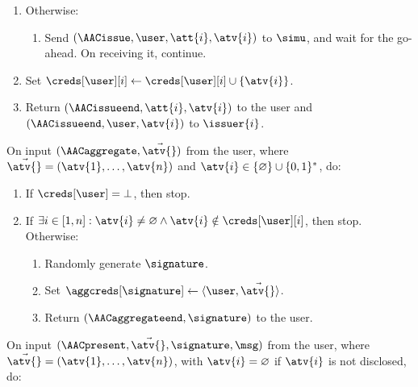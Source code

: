 \begin{framed}
\begin{enumerate}
\begin{enumerate}
	    \end{enumerate}

	  \item Otherwise:

	    \begin{enumerate}

	      \item Send $(\AACissue, \user, \att{i}, \atv{i})$ to $\simu$, and
wait for the go-ahead. On receiving it, continue.

	    \end{enumerate}

	  \item Set $\creds[\user][i] \leftarrow \creds[\user][i] \cup
\{\atv{i}\}$.

	  \item Return $(\AACissueend, \att{i}, \atv{i})$ to the user and
$(\AACissueend, \user, \atv{i})$ to $\issuer{i}$.

	\end{enumerate}

	\fuinterface{\AACaggregate} On input $(\AACaggregate, \vec{\atv{}})$ from the
user, where $\vec{\atv{}} = (\atv{1}, \ldots, \atv{n})$ and $\atv{i} \in
\{\varnothing\} \cup \{0, 1\}^*$, do:

	\begin{enumerate}

	  \item If $\creds[\user] = \bot$, then stop.

	  \item If $\exists i \in [1, n]: \atv{i} \neq \varnothing \land \atv{i}
\notin \creds[\user][i]$, then stop. Otherwise:

	    \begin{enumerate}

	      \item Randomly generate $\signature$.

	      \item Set $\aggcreds[\signature] \leftarrow \langle \user,
\vec{\atv{}}\rangle$.

	      \item Return $(\AACaggregateend, \signature)$ to the user.

	    \end{enumerate}

	\end{enumerate}

	\fuinterface{\AACpresent} On input $(\AACpresent, \vec{\atv{}}, \signature,
\msg)$ from the user, where $\vec{\atv{}} = (\atv{1}, \ldots, \atv{n})$, with
$\atv{i} = \varnothing$ if $\atv{i}$ is not disclosed, do:


\end{framed}
